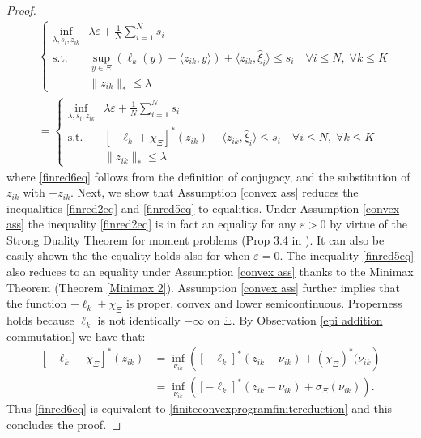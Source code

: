 \documentclass[11pt,a4paper,oneside,openany]{book}
\numberwithin{definition}{section}
\numberwithin{theorem}{section}
\numberwithin{problem}{section}
\begin{document}
\begin{proof}
\begin{align}
    & \left\{
        \begin{aligned}
            \inf_{\lambda,s_i,z_{ik}} & \lambda \varepsilon + \frac{1}{N}\sum_{i=1}^N s_i \\
            \text{s.t.} & \sup_{y \in \Xi} \left( \ell_k(y) - \langle z_{ik}, y \rangle\right) + \langle z_{ik}, \hat \xi_i \rangle \leq s_i \quad \forall i \leq N,\; \forall k \leq K \\
            & \|z_{ik}\|_* \leq \lambda
        \end{aligned}
    \right. \\ \label{finred6eq}
    & = \left\{
        \begin{aligned}
            \inf_{\lambda,s_i,z_{ik}} & \lambda \varepsilon + \frac{1}{N}\sum_{i=1}^N s_i \\
            \text{s.t.} & \left[ -\ell_k + \chi_{\Xi} \right]^*(z_{ik}) - \langle z_{ik}, \hat \xi_i \rangle \leq s_i \quad \forall i \leq N,\; \forall k \leq K \\
            & \|z_{ik}\|_* \leq \lambda
        \end{aligned}
    \right.    
\end{align}
where \eqref{finred6eq} follows from the definition of conjugacy, and the substitution of $z_{ik}$ with $-z_{ik}$. Next, we show that Assumption \ref{convex ass} reduces the inequalities \eqref{finred2eq} and \eqref{finred5eq} to equalities. Under Assumption \ref{convex ass} the inequality \eqref{finred2eq} is in fact an equality for any $\varepsilon > 0$ by virtue of the Strong Duality Theorem for moment problems (Prop 3.4 in \cite{dualitymomentproblems}). It can also be easily shown the the equality holds also for when $\varepsilon = 0$. The inequality \eqref{finred5eq} also reduces to an equality under Assumption \ref{convex ass} thanks to the Minimax Theorem (Theorem \ref{Minimax 2}). Assumption \ref{convex ass} further implies that the function $-\ell_k + \chi_{\Xi}$ is proper, convex and lower semicontinuous. Properness holds because $\ell_k$ is not identically $- \infty$ on $\Xi$. By Observation \ref{epi addition commutation} we have that:
\begin{align}
    \left[ -\ell_k + \chi_{\Xi}\right]^*(z_{ik}) &= \inf_{\nu_{ik}}\left(\left[ -\ell_k\right]^*(z_{ik}-\nu_{ik}) + (\chi_{\Xi})^*(\nu_{ik}\right) \\
    &= \inf_{\nu_{ik}}\left(\left[-\ell_k\right]^*(z_{ik}-\nu_{ik}) + \sigma_{\Xi}(\nu_{ik})\right).
\end{align}
Thus \eqref{finred6eq} is equivalent to \eqref{finiteconvexprogramfinitereduction} and this concludes the proof.
\end{proof}
\end{document}

